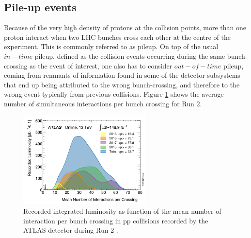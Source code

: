 \subsection{Pile-up events}
\label{chap2:LHC:PU}
Because of the very high density of protons at the collision points, more than one proton interact when two LHC bunches cross each other at the centre of the experiment. This is commonly referred to as pileup. On top of the usual $in-time$ pileup, defined as the collision events occurring during the same bunch-crossing as the event of interest, one also has to consider $out-of-time$ pileup, coming from remnants of information found in some of the detector subsystems that end up being attributed to the wrong bunch-crossing, and therefore to the wrong event typically from previous collisions. Figure \ref{fig:chap2:LHC:PU} shows the average number of simultaneous interactions per bunch crossing for Run 2. \\
\begin{figure}[htbp]
    \centering
    \includegraphics[width=0.6\textwidth]{Ch2/Img/PU.png}
    \caption{Recorded integrated luminosity as function of the mean number of interaction per bunch crossing in pp collisions recorded by the ATLAS detector during Run 2 \cite{Lumi2018}.}
    \label{fig:chap2:LHC:PU}
\end{figure}

